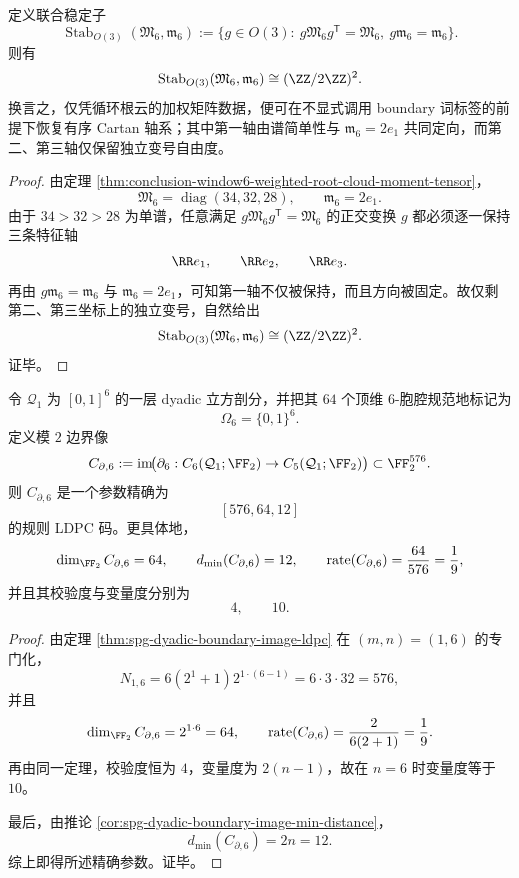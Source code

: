 \begin{corollary}\label{cor:conclusion-window6-moment-tensor-axis-pinning}
定义联合稳定子
\[
\operatorname{Stab}_{O(3)}(\mathfrak M_6,\mathfrak m_6)
:=
\bigl\{
g\in O(3):
\ g\mathfrak M_6 g^{\mathsf T}=\mathfrak M_6,\ 
g\mathfrak m_6=\mathfrak m_6
\bigr\}.
\]
则有
\[
\operatorname{Stab}_{O(3)}(\mathfrak M_6,\mathfrak m_6)\cong (\ZZ/2\ZZ)^2.
\]
换言之，仅凭循环根云的加权矩阵数据，便可在不显式调用 boundary 词标签的前提下恢复有序 Cartan 轴系；其中第一轴由谱简单性与 \(\mathfrak m_6=2e_1\) 共同定向，而第二、第三轴仅保留独立变号自由度。
\end{corollary}
\begin{proof}
由定理 \ref{thm:conclusion-window6-weighted-root-cloud-moment-tensor}，
\[
\mathfrak M_6=\operatorname{diag}(34,32,28),
\qquad
\mathfrak m_6=2e_1.
\]
由于 \(34>32>28\) 为单谱，任意满足 \(g\mathfrak M_6 g^{\mathsf T}=\mathfrak M_6\) 的正交变换 \(g\) 都必须逐一保持三条特征轴
\[
\RR e_1,\qquad \RR e_2,\qquad \RR e_3.
\]
再由 \(g\mathfrak m_6=\mathfrak m_6\) 与 \(\mathfrak m_6=2e_1\)，可知第一轴不仅被保持，而且方向被固定。故仅剩第二、第三坐标上的独立变号，自然给出
\[
\operatorname{Stab}_{O(3)}(\mathfrak M_6,\mathfrak m_6)\cong (\ZZ/2\ZZ)^2.
\]
证毕。
\end{proof}

\begin{theorem}\label{thm:conclusion-window6-boundary-image-ldpc-576-64-12}
令 \(\mathcal Q_1\) 为 \([0,1]^6\) 的一层 dyadic 立方剖分，并把其 \(64\) 个顶维 \(6\)-胞腔规范地标记为
\[
\Omega_6=\{0,1\}^6.
\]
定义模 \(2\) 边界像
\[
C_{\partial,6}
:=
\operatorname{im}\!\bigl(
\partial_6:
C_6(\mathcal Q_1;\FF_2)\to C_5(\mathcal Q_1;\FF_2)
\bigr)
\subset \FF_2^{576}.
\]
则 \(C_{\partial,6}\) 是一个参数精确为
\[
[576,64,12]
\]
的规则 LDPC 码。更具体地，
\[
\dim_{\FF_2}C_{\partial,6}=64,
\qquad
d_{\min}(C_{\partial,6})=12,
\qquad
\operatorname{rate}(C_{\partial,6})=\frac{64}{576}=\frac19,
\]
并且其校验度与变量度分别为
\[
4,
\qquad
10.
\]
\end{theorem}
\begin{proof}
由定理 \ref{thm:spg-dyadic-boundary-image-ldpc} 在 \((m,n)=(1,6)\) 的专门化，
\[
N_{1,6}
=
6(2^1+1)2^{1\cdot(6-1)}
=
6\cdot 3\cdot 32
=
576,
\]
并且
\[
\dim_{\FF_2}C_{\partial,6}=2^{1\cdot 6}=64,
\qquad
\operatorname{rate}(C_{\partial,6})=\frac{2}{6(2+1)}=\frac19.
\]
再由同一定理，校验度恒为 \(4\)，变量度为 \(2(n-1)\)，故在 \(n=6\) 时变量度等于 \(10\)。

最后，由推论 \ref{cor:spg-dyadic-boundary-image-min-distance}，
\[
d_{\min}(C_{\partial,6})=2n=12.
\]
综上即得所述精确参数。证毕。
\end{proof}

